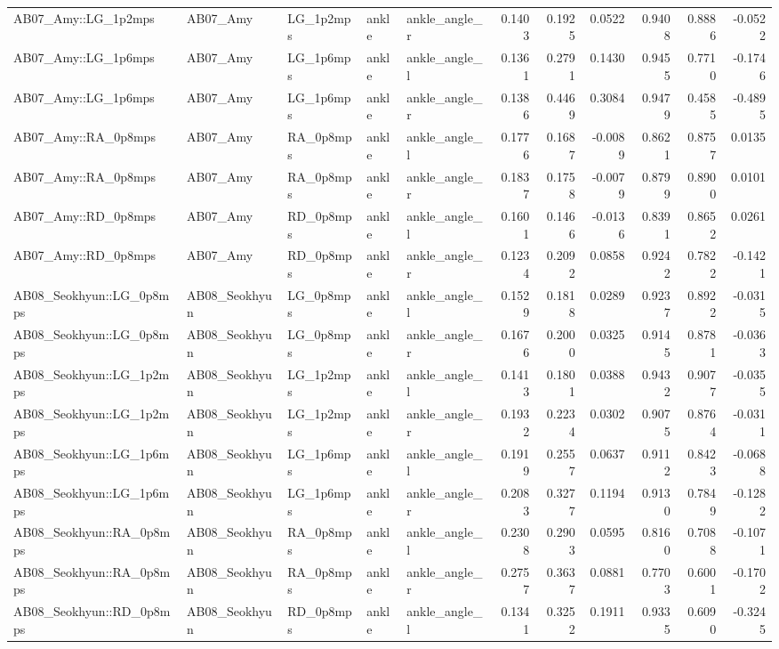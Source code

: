 \begin{table}
\begin{tabular}{lllllrrrrrr}
AB07_Amy::LG_1p2mps & AB07_Amy & LG_1p2mps & ankle & ankle_angle_r & 0.1403 & 0.1925 & 0.0522 & 0.9408 & 0.8886 & -0.0522 \\
AB07_Amy::LG_1p6mps & AB07_Amy & LG_1p6mps & ankle & ankle_angle_l & 0.1361 & 0.2791 & 0.1430 & 0.9455 & 0.7710 & -0.1746 \\
AB07_Amy::LG_1p6mps & AB07_Amy & LG_1p6mps & ankle & ankle_angle_r & 0.1386 & 0.4469 & 0.3084 & 0.9479 & 0.4585 & -0.4895 \\
AB07_Amy::RA_0p8mps & AB07_Amy & RA_0p8mps & ankle & ankle_angle_l & 0.1776 & 0.1687 & -0.0089 & 0.8621 & 0.8757 & 0.0135 \\
AB07_Amy::RA_0p8mps & AB07_Amy & RA_0p8mps & ankle & ankle_angle_r & 0.1837 & 0.1758 & -0.0079 & 0.8799 & 0.8900 & 0.0101 \\
AB07_Amy::RD_0p8mps & AB07_Amy & RD_0p8mps & ankle & ankle_angle_l & 0.1601 & 0.1466 & -0.0136 & 0.8391 & 0.8652 & 0.0261 \\
AB07_Amy::RD_0p8mps & AB07_Amy & RD_0p8mps & ankle & ankle_angle_r & 0.1234 & 0.2092 & 0.0858 & 0.9242 & 0.7822 & -0.1421 \\
AB08_Seokhyun::LG_0p8mps & AB08_Seokhyun & LG_0p8mps & ankle & ankle_angle_l & 0.1529 & 0.1818 & 0.0289 & 0.9237 & 0.8922 & -0.0315 \\
AB08_Seokhyun::LG_0p8mps & AB08_Seokhyun & LG_0p8mps & ankle & ankle_angle_r & 0.1676 & 0.2000 & 0.0325 & 0.9145 & 0.8781 & -0.0363 \\
AB08_Seokhyun::LG_1p2mps & AB08_Seokhyun & LG_1p2mps & ankle & ankle_angle_l & 0.1413 & 0.1801 & 0.0388 & 0.9432 & 0.9077 & -0.0355 \\
AB08_Seokhyun::LG_1p2mps & AB08_Seokhyun & LG_1p2mps & ankle & ankle_angle_r & 0.1932 & 0.2234 & 0.0302 & 0.9075 & 0.8764 & -0.0311 \\
AB08_Seokhyun::LG_1p6mps & AB08_Seokhyun & LG_1p6mps & ankle & ankle_angle_l & 0.1919 & 0.2557 & 0.0637 & 0.9112 & 0.8423 & -0.0688 \\
AB08_Seokhyun::LG_1p6mps & AB08_Seokhyun & LG_1p6mps & ankle & ankle_angle_r & 0.2083 & 0.3277 & 0.1194 & 0.9130 & 0.7849 & -0.1282 \\
AB08_Seokhyun::RA_0p8mps & AB08_Seokhyun & RA_0p8mps & ankle & ankle_angle_l & 0.2308 & 0.2903 & 0.0595 & 0.8160 & 0.7088 & -0.1071 \\
AB08_Seokhyun::RA_0p8mps & AB08_Seokhyun & RA_0p8mps & ankle & ankle_angle_r & 0.2757 & 0.3637 & 0.0881 & 0.7703 & 0.6001 & -0.1702 \\
AB08_Seokhyun::RD_0p8mps & AB08_Seokhyun & RD_0p8mps & ankle & ankle_angle_l & 0.1341 & 0.3252 & 0.1911 & 0.9335 & 0.6090 & -0.3245 \\

\end{tabular}
\end{table}
